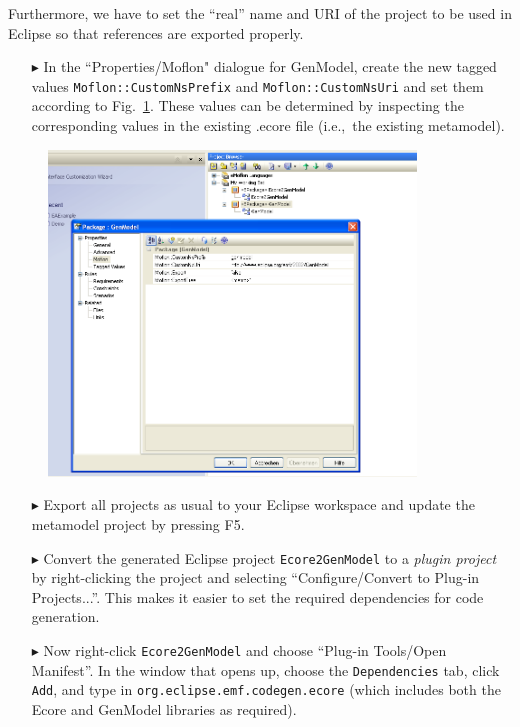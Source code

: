 Furthermore, we have to set the ``real'' name and URI of the project to be used in Eclipse so that references are exported properly. 
\begin{enumerate}
\item[$\blacktriangleright$] In the ``Properties/Moflon" dialogue for \textsf{GenModel}, create the new tagged values \texttt{Moflon::CustomNsPrefix} and \texttt{Moflon::CustomNsUri} and set them according to Fig.~\ref{fig_customNS}.
These values can be determined by inspecting the corresponding values in the existing .ecore file (i.e.,~the existing metamodel).
\end{enumerate}

\begin{figure}[htbp]
\begin{center}  \includegraphics[width=0.87\textwidth]{pics/Ecore2GenModel_Bilder/8_nsUriPre.png}
  \caption{}  
  \label{fig_customNS}
\end{center}
\end{figure}

\begin{enumerate}
\item[$\blacktriangleright$] Export all projects as usual to your Eclipse workspace and update the metamodel project by pressing \textsf{F5}.
\item[$\blacktriangleright$] Convert the generated Eclipse project \texttt{Ecore2GenModel} to a \emph{plugin project} by right-clicking the project and selecting ``Configure/Convert to Plug-in Projects...''.
This makes it easier to set the required dependencies for code generation.
\item[$\blacktriangleright$] Now right-click \texttt{Ecore2GenModel} and choose ``Plug-in Tools/Open Manifest''.
In the window that opens up, choose the \texttt{Dependencies} tab, click \texttt{Add}, and type in \texttt{org.eclipse.emf.codegen.ecore} (which includes both the \textsf{Ecore} and \textsf{GenModel} libraries as required).
\end{enumerate}

